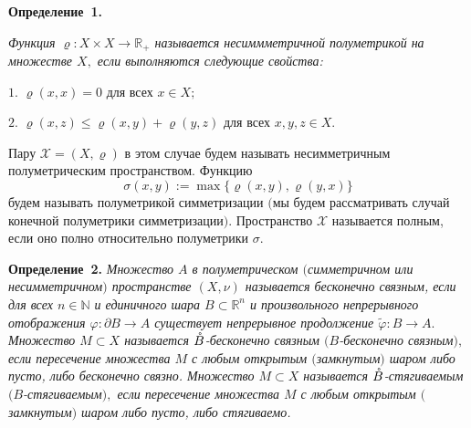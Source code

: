 \documentclass{vzmsthesis}
\begin{document}




\vzmscaption






\textbf{Определение~1.} {\it
Функция $\varrho:X\times X\rightarrow \mathbb{R}_+$ называется несиммметричной полуметрикой на множестве $X,$
если выполняются следующие свойства:

$1.$ $\varrho(x,x)= 0$ для всех $x\in X;$


$2.$ $\varrho(x,z)\leqslant \varrho(x,y)+ \varrho(y,z)$ для всех $x,y,z\in X.$

Пару $\mathcal{X}=(X,\varrho)$ в этом случае будем называть несимметричным полуметрическим пространством.
Функцию $$\sigma(x,y):=\max\{\varrho(x,y), \varrho(y,x)\}$$ будем называть полуметрикой симметри\-за\-ции $($мы будем рассматривать случай конечной полуметрики симметри\-за\-ции$)$. Пространство $\mathcal{X}$ называется полным, если оно полно относительно полуметрики  $\sigma.$
}


\textbf{Определение~2.} {\it   Множество $A$ в   полуметрическом $($сим\-мет\-ричном или несимметричном$)$ пространстве $(X,\nu) $
называется бесконечно связным, если для всех $n\in \mathbb{N}$ и
единичного шара $B\subset \mathbb{R}^n$ и произвольного
непрерывного отображения $\varphi:\partial B\rightarrow A$
существует непрерывное продолжение $\tilde{\varphi}: B\rightarrow
A.$
  Множество $M\subset X $ называется
$\mathaccent'27{B}$-бесконечно связным $({B}$-бесконечно связным$),$ если пересечение множества
$M$ с любым открытым $($замкнутым$)$ шаром либо пусто, либо бесконечно связно.  Множество $M\subset X $ называется
$\mathaccent'27{B}$-стягиваемым $({B}$-стягиваемым$),$ если пересечение множества
$M$ с любым открытым $($замкнутым$)$ шаром либо пусто, либо стягиваемо.
}
\end{document}
